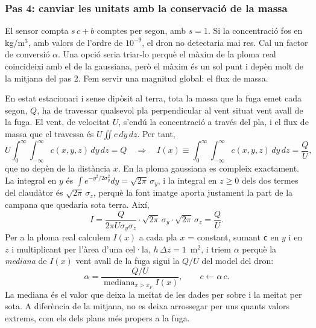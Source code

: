 \documentclass[11pt,a4paper]{article}
\begin{document}
\subsubsection*{Pas 4: canviar les unitats amb la conservació de la massa}

El sensor compta $s\,c + b$ comptes per segon, amb $s = 1$. Si la concentració fos en kg/m$^3$, amb valors de l'ordre de $10^{-9}$, el dron no detectaria mai res. Cal un factor de conversió $\alpha$. Una opció seria triar-lo perquè el màxim de la ploma real coincideixi amb el de la gaussiana, però el màxim és un sol punt i depèn molt de la mitjana del pas 2. Fem servir una magnitud global: el flux de massa.

En estat estacionari i sense dipòsit al terra, tota la massa que la fuga emet cada segon, $Q$, ha de travessar qualsevol pla perpendicular al vent situat vent avall de la fuga. El vent, de velocitat $U$, s'endú la concentració a través del pla, i el flux de massa que el travessa és $U \iint c \, dy\, dz$. Per tant,
\begin{equation}
U \int_0^\infty \!\! \int_{-\infty}^{\infty} c(x, y, z)\, dy\, dz = Q \quad \Longrightarrow \quad I(x) \equiv \int_0^\infty \!\! \int_{-\infty}^{\infty} c(x, y, z)\, dy\, dz = \frac{Q}{U},
\label{eq:flux}
\end{equation}
que no depèn de la distància $x$. En la ploma gaussiana es compleix exactament. La integral en $y$ és $\int e^{-y^2/2\sigma_y^2} dy = \sqrt{2\pi}\,\sigma_y$, i la integral en $z \geq 0$ dels dos termes del claudàtor és $\sqrt{2\pi}\,\sigma_z$, perquè la font imatge aporta justament la part de la campana que quedaria sota terra. Així,
\begin{equation}
I = \frac{Q}{2\pi U \sigma_y \sigma_z} \cdot \sqrt{2\pi}\,\sigma_y \cdot \sqrt{2\pi}\,\sigma_z = \frac{Q}{U}.
\end{equation}
Per a la ploma real calculem $I(x)$ a cada pla $x$ = constant, sumant \texttt{c} en $y$ i en $z$ i multiplicant per l'àrea d'una cel·la, $h\,\Delta z = 1$~m$^2$, i triem $\alpha$ perquè la \emph{mediana} de $I(x)$ vent avall de la fuga sigui la $Q/U$ del model del dron:
\begin{equation}
\alpha = \frac{Q/U}{\operatorname{mediana}_{x > x_F} I(x)}, \qquad c \leftarrow \alpha\, c.
\end{equation}
La mediana és el valor que deixa la meitat de les dades per sobre i la meitat per sota. A diferència de la mitjana, no es deixa arrossegar per uns quants valors extrems, com els dels plans més propers a la fuga.
\end{document}
